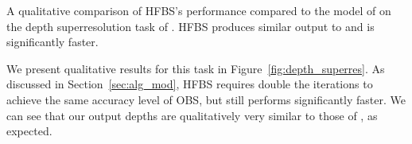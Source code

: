 \begin{marginfigure}
{  }
  \vspace{10pt}
  \caption{A qualitative comparison of HFBS's performance
  compared to the model of \cite{BarronPoole2016} on the depth superresolution
  task of \cite{ferstl2013b}. HFBS produces similar output to \cite{BarronPoole2016} and is significantly faster.}
  \label{fig:depth_superres}
\end{marginfigure}


We present qualitative results for this task in Figure~\ref{fig:depth_superres}.
As discussed in Section~\ref{sec:alg_mod}, HFBS requires double the iterations to achieve the same accuracy level of OBS, but still performs significantly faster.
We can see that our output depths are qualitatively very similar to those of
\cite{BarronPoole2016}, as expected.
